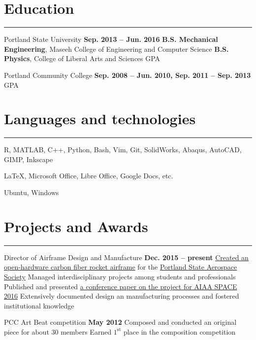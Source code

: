 \section{Education}
	\noindent\rule{\textwidth}{\hlinewidth}
	\begin{innerlist}
	\item Portland State University		\hfill\textbf{Sep. 2013 -- Jun. 2016}
		\subitem \textbf{B.S. Mechanical Engineering}, Maseeh College of Engineering and Computer Science 
		\subitem\textbf{B.S. Physics}, College of Liberal Arts and Sciences
		 GPA
	\\
	\item Portland Community College  \hfill\textbf{Sep. 2008 -- Jun. 2010, Sep. 2011 -- Sep. 2013}
		 GPA
	\end{innerlist}
\vfill
\section{Languages and technologies}

\noindent\rule{\textwidth}{\hlinewidth}
    \begin{innerlist}
        \item R, MATLAB, C++, Python, Bash, Vim, Git, SolidWorks, Abaqus, AutoCAD, GIMP, Inkscape
        \item \LaTeX, Microsoft Office, Libre Office, Google Docs, etc.
	\item Ubuntu, Windows
    \end{innerlist}
\vfill
\section{Projects and Awards}
\noindent\rule{\textwidth}{\hlinewidth}
	\begin{innerlist}
	\item Director of Airframe Design and Manufacture
		\hfill\textbf{Dec. 2015 -- present} %
		\subitem \href{https://github.com/psas/sw-cad-airframe-lv3.0}{Created 
			an open-hardware carbon fiber rocket airframe} for the 
			\href{http://psas.pdx.edu/}{Portland State Aerospace Society}
		\subitem Managed interdisciplinary projects among students and professionals
		\subitem Published and presented \href{http://arc.aiaa.org/doi/pdf/10.2514/6.2016-5365}{a conference paper on the project for AIAA SPACE 2016}
		\subitem Extensively documented design an manufacturing processes and fostered institutional knowledge
	\\
	\item PCC Art Beat competition \hfill\textbf{May 2012}
		\subitem Composed and conducted an original piece for about 30 members
		\subitem Earned $1^\text{st}$ place in the composition competition
	\end{innerlist}
\vfill
